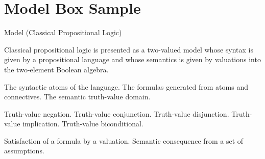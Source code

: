 \documentclass[12pt,a4paper]{report}
\begin{document}
\chapter*{Model Box Sample}

\begin{modelbox}{Model (Classical Propositional Logic)}
\begin{model}\label{model:classical-propositional-logic}

Classical propositional logic is presented as a two-valued model whose
syntax is given by a propositional language and whose semantics is given by
valuations into the two-element Boolean algebra.

\begin{modelsorts}
    {The syntactic atoms of the language.}
    {The formulas generated from atoms and connectives.}
    {The semantic truth-value domain.}
\end{modelsorts}

\begin{modelconstants}
\end{modelconstants}

\begin{modelarity}
\end{modelarity}

\begin{modelfunctions}
    {Truth-value negation.}
    {Truth-value conjunction.}
    {Truth-value disjunction.}
    {Truth-value implication.}
    {Truth-value biconditional.}
\end{modelfunctions}

\begin{modelrelations}
    {Satisfaction of a formula by a valuation.}
  \modelrelation{\models}{\Gamma \models \varphi}
    {Semantic consequence from a set of assumptions.}
\end{modelrelations}


\end{model}
\end{modelbox}
\end{document}

